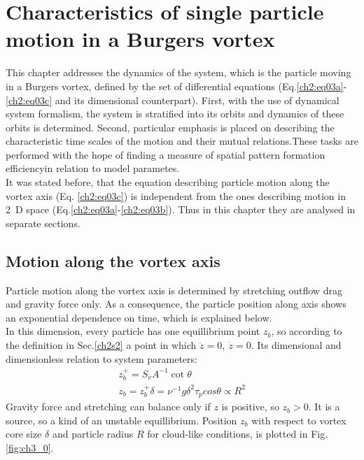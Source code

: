\documentclass[../main.tex]{subfiles}
\begin{document}
\chapter{Characteristics of single particle motion in a Burgers vortex} %

\label{ch:single} %

This chapter addresses the dynamics of the system, which is the particle moving in a Burgers vortex, defined by the set of differential equations (Eq.\ref{ch2:eq03a}-\ref{ch2:eq03c} and its dimensional counterpart). First, with the use of dynamical system formalism, the system is stratified into its orbits and dynamics of these orbits is determined. Second, particular emphasis is placed on describing the characteristic time scales of the motion and their mutual relations.These tasks are performed with the hope of finding a measure of spatial pattern formation efficiencyin relation to model parametes.\\
It was stated before, that the equation describing particle motion along the vortex axis (Eq. \ref{ch2:eq03c}) is independent from the ones describing motion in 2~D space (Eq.\ref{ch2:eq03a}-\ref{ch2:eq03b}). Thus in this chapter they are analysed in separate sections.
 
\section{Motion along the vortex axis}
Particle motion along the vortex axis is determined by stretching outflow drag and gravity force only. As a consequence, the particle position along axis shows an exponential dependence on time, which is explained below.\\
In this dimension, every particle has one equillibrium point $z_b$, so according to the definition in Sec.\ref{ch2s2} a point in which $\ddot{z}=0,\ \dot{z}=0$. Its dimensional and dimensionless relation to system parameters:
\begin{align}
z^+_b=S_v A^{-1} \cot\theta\\
z_b=z^+_b \delta=\nu^{-1}g \delta^2 \tau_p cos\theta \propto R^2
\label{def:z_b}
\end{align}
Gravity force and stretching can balance only if $z$ is positive, so $z_b>0$. It is a source, so a kind of an unstable equillibrium. Position $z_b$ with respect to vortex core size $\delta$ and particle radius $R$ for cloud-like conditions, is plotted in Fig.\ref{fig:ch3_0}.
\end{document}
